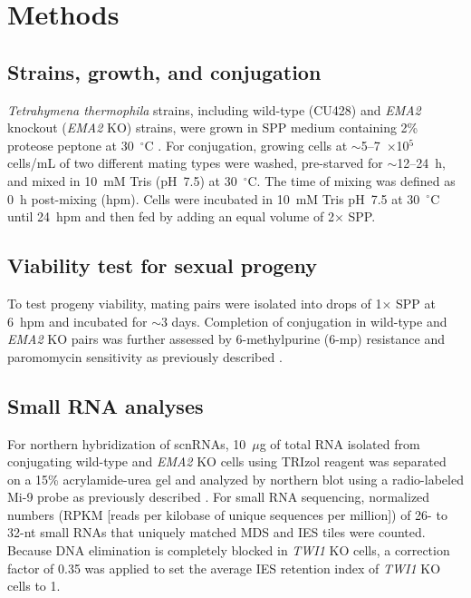 \documentclass[11pt,a4paper]{article}
\begin{document}
\section{Methods}

\subsection{Strains, growth, and conjugation}
\textit{Tetrahymena thermophila} strains, including wild-type (CU428) and \textit{EMA2} knockout (\textit{EMA2} KO) strains, were grown in SPP medium containing 2\% proteose peptone at 30~$^\circ$C \citep{Gorovsky1975}. For conjugation, growing cells at $\sim$5--7~$\times$10$^{5}$ cells/mL of two different mating types were washed, pre-starved for $\sim$12--24~h, and mixed in 10~mM Tris (pH~7.5) at 30~$^\circ$C. The time of mixing was defined as 0~h post-mixing (hpm). Cells were incubated in 10~mM Tris pH~7.5 at 30~$^\circ$C until 24~hpm and then fed by adding an equal volume of 2$\times$ SPP.

\subsection{Viability test for sexual progeny}
To test progeny viability, mating pairs were isolated into drops of 1$\times$ SPP at 6~hpm and incubated for $\sim$3 days. Completion of conjugation in wild-type and \textit{EMA2} KO pairs was further assessed by 6-methylpurine (6-mp) resistance and paromomycin sensitivity as previously described \citep{Mochizuki2002}.

\subsection{Small RNA analyses}
For northern hybridization of scnRNAs, 10~$\mu$g of total RNA isolated from conjugating wild-type and \textit{EMA2} KO cells using TRIzol reagent was separated on a 15\% acrylamide-urea gel and analyzed by northern blot using a radio-labeled Mi-9 probe as previously described \citep{Aronica2008}. For small RNA sequencing, normalized numbers (RPKM [reads per kilobase of unique sequences per million]) of 26- to 32-nt small RNAs that uniquely matched MDS and IES tiles were counted. Because DNA elimination is completely blocked in \textit{TWI1} KO cells, a correction factor of 0.35 was applied to set the average IES retention index of \textit{TWI1} KO cells to 1.
\end{document}
